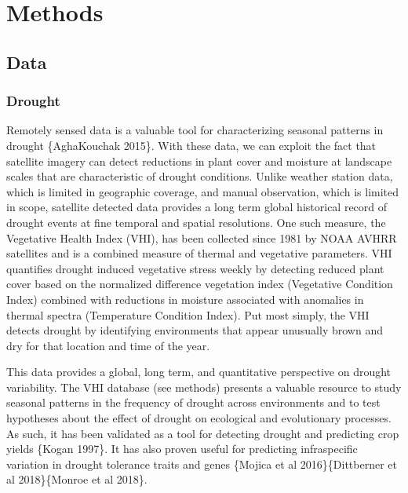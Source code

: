 \documentclass[man,floatsintext]{apa6}
\theoremstyle{definition}
\theoremstyle{definition}
\theoremstyle{definition}
\theoremstyle{remark}
\begin{document}
\hypertarget{methods}{%
\section{Methods}\label{methods}}

\hypertarget{data}{%
\subsection{Data}\label{data}}

\hypertarget{drought}{%
\subsubsection{Drought}\label{drought}}

Remotely sensed data is a valuable tool for characterizing seasonal
patterns in drought \{AghaKouchak 2015\}. With these data, we can
exploit the fact that satellite imagery can detect reductions in plant
cover and moisture at landscape scales that are characteristic of
drought conditions. Unlike weather station data, which is limited in
geographic coverage, and manual observation, which is limited in scope,
satellite detected data provides a long term global historical record of
drought events at fine temporal and spatial resolutions. One such
measure, the Vegetative Health Index (VHI), has been collected since
1981 by NOAA AVHRR satellites and is a combined measure of thermal and
vegetative parameters. VHI quantifies drought induced vegetative stress
weekly by detecting reduced plant cover based on the normalized
difference vegetation index (Vegetative Condition Index) combined with
reductions in moisture associated with anomalies in thermal spectra
(Temperature Condition Index). Put most simply, the VHI detects drought
by identifying environments that appear unusually brown and dry for that
location and time of the year.

This data provides a global, long term, and quantitative perspective on
drought variability. The VHI database (see methods) presents a valuable
resource to study seasonal patterns in the frequency of drought across
environments and to test hypotheses about the effect of drought on
ecological and evolutionary processes. As such, it has been validated as
a tool for detecting drought and predicting crop yields \{Kogan 1997\}.
It has also proven useful for predicting infraspecific variation in
drought tolerance traits and genes \{Mojica et al 2016\}\{Dittberner et
al 2018\}\{Monroe et al 2018\}.
\end{document}
